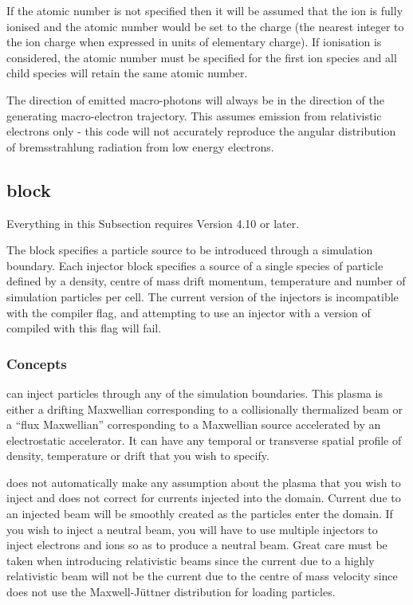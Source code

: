 If the atomic number is not specified then it will be assumed that the ion is
fully ionised and the atomic number would be set to the charge (the nearest
integer to the ion charge when expressed in units of elementary charge). If
ionisation is considered, the atomic number must be specified for the first
ion species and all child species will retain the same atomic number.

The direction of emitted macro-photons will always be in the direction of the
generating macro-electron trajectory. This assumes emission from relativistic
electrons only - this code will not accurately reproduce the angular
distribution of bremsstrahlung radiation from low energy electrons.

\subsection{\texorpdfstring
  { block}
  {           {injector} block}}
\label{sec:injector_block}

{\emphtext
Everything in this Subsection requires {\EPOCH} Version 4.10 or later.}

The  block specifies a particle source to be introduced
through a simulation boundary. Each injector block specifies a source of a
single species of particle defined by a density, centre of mass drift momentum,
temperature and number of simulation particles per cell. The current version
of the injectors is incompatible with the 
compiler flag, and attempting to use an injector with a version of {\EPOCH}
compiled with this flag will fail.

\subsubsection{Concepts}

{\EPOCH} can inject particles through any of the simulation boundaries. This
plasma is either a drifting Maxwellian corresponding to a collisionally
thermalized beam or a ``flux Maxwellian'' corresponding to a Maxwellian source
accelerated by an electrostatic accelerator. It can have any temporal or
transverse spatial profile of density, temperature or drift that you wish to
specify.

{\EPOCH} does not automatically make any assumption about the plasma that you
wish to inject and does not correct for currents injected into the domain.
Current due to an injected beam will be smoothly created as the particles enter
the domain. If you wish to inject a neutral beam, you will have to use multiple
injectors to inject electrons and ions so as to produce a neutral beam. Great
care must be taken when introducing relativistic beams since the current due
to a highly relativistic beam will not be the current due to the centre of mass
velocity since {\EPOCH} does not use the Maxwell-J\"{u}ttner distribution for
loading particles.

